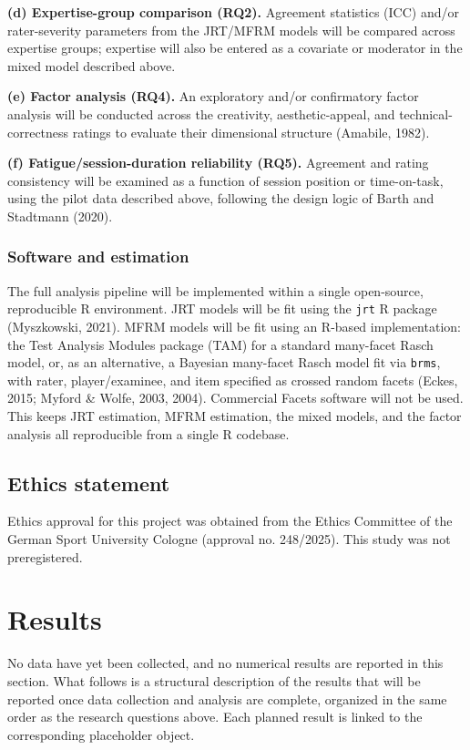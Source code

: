 \documentclass[
  12pt,
]{article}
\begin{document}
\textbf{(d) Expertise-group comparison (RQ2).} Agreement statistics
(ICC) and/or rater-severity parameters from the JRT/MFRM models will be
compared across expertise groups; expertise will also be entered as a
covariate or moderator in the mixed model described above.

\textbf{(e) Factor analysis (RQ4).} An exploratory and/or confirmatory
factor analysis will be conducted across the creativity,
aesthetic-appeal, and technical-correctness ratings to evaluate their
dimensional structure (Amabile, 1982).

\textbf{(f) Fatigue/session-duration reliability (RQ5).} Agreement and
rating consistency will be examined as a function of session position or
time-on-task, using the pilot data described above, following the design
logic of Barth and Stadtmann (2020).

\subsubsection{Software and estimation}\label{software-and-estimation}

The full analysis pipeline will be implemented within a single
open-source, reproducible R environment. JRT models will be fit using
the \texttt{jrt} R package (Myszkowski, 2021). MFRM models will be fit
using an R-based implementation: the Test Analysis Modules package (TAM)
for a standard many-facet Rasch model, or, as an alternative, a Bayesian
many-facet Rasch model fit via \texttt{brms}, with rater,
player/examinee, and item specified as crossed random facets (Eckes,
2015; Myford \& Wolfe, 2003, 2004). Commercial Facets software will not
be used. This keeps JRT estimation, MFRM estimation, the mixed models,
and the factor analysis all reproducible from a single R codebase.

\subsection{Ethics statement}\label{ethics-statement}

Ethics approval for this project was obtained from the Ethics Committee
of the German Sport University Cologne (approval no. 248/2025). This
study was not preregistered.

\section{Results}\label{results}

No data have yet been collected, and no numerical results are reported
in this section. What follows is a structural description of the results
that will be reported once data collection and analysis are complete,
organized in the same order as the research questions above. Each
planned result is linked to the corresponding placeholder object.
\end{document}
